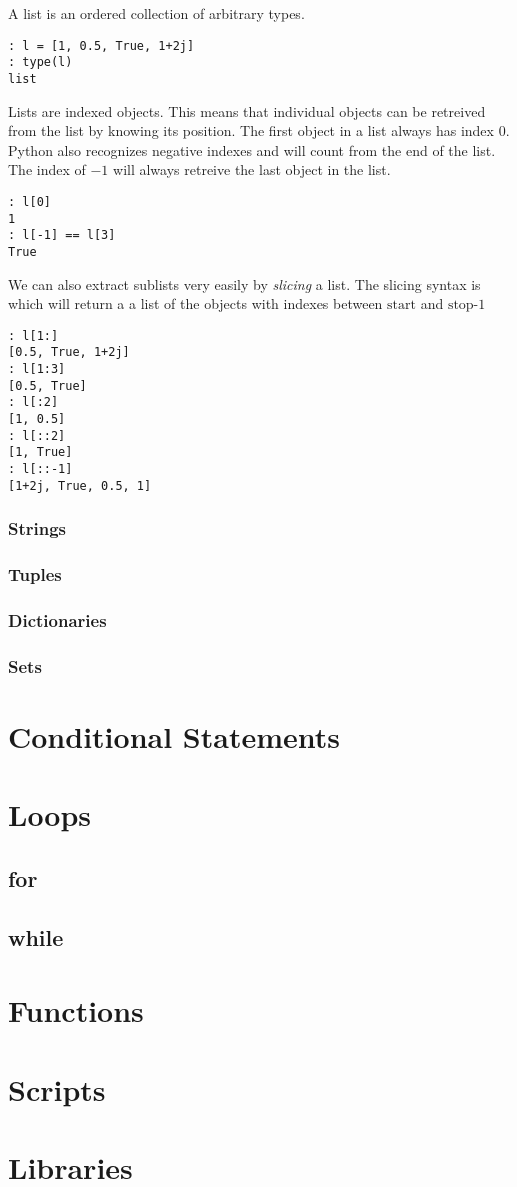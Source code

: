 A list is an ordered collection of arbitrary types.
\begin{lstlisting}[style=python]
: l = [1, 0.5, True, 1+2j]
: type(l)
list
\end{lstlisting}
Lists are indexed objects.  This means that individual objects can be retreived from the list by knowing its position.  The first object in a list always has index $0$.  Python also recognizes negative indexes and will count from the end of the list.  The index of $-1$ will always retreive the last object in the list.
\begin{lstlisting}[style=python]
: l[0]
1
: l[-1] == l[3]
True
\end{lstlisting}
We can also extract sublists very easily by \emph{slicing} a list.  The slicing syntax is  which will return a a list of the objects with indexes between $\mbox{start}$ and $\mbox{stop-1}$
\begin{lstlisting}[style=python]
: l[1:]
[0.5, True, 1+2j]
: l[1:3]
[0.5, True]
: l[:2]
[1, 0.5]
: l[::2]
[1, True]
: l[::-1]
[1+2j, True, 0.5, 1]
\end{lstlisting}




\subsubsection*{Strings}

\subsubsection*{Tuples}

\subsubsection*{Dictionaries}

\subsubsection*{Sets}

\section*{Conditional Statements}

\section*{Loops}
\subsection*{for}
\subsection*{while}

\section*{Functions}

\section*{Scripts}

\section*{Libraries}